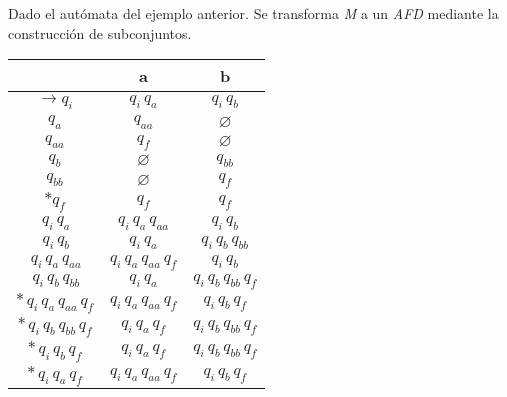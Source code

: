 Dado el autómata del ejemplo anterior. Se transforma \textit{M} a un \textit{AFD} mediante la construcción de subconjuntos.
\begin{table}[h]
  \centering
  \begin{tabular}{c|c|c}
    \hline
    & a & b \\
    \hline
    $\rightarrow q_i$ & $q_i\,q_a$ & $q_i\,q_b$ \\
    $q_a$             & $q_{aa}$   & $\varnothing$ \\
    $q_{aa}$          & $q_f$      & $\varnothing$ \\
    $q_b$             & $\varnothing$ & $q_{bb}$ \\
    $q_{bb}$          & $\varnothing$ & $q_f$ \\
    $*q_f$             & $q_f$      & $q_f$ \\
    \hline
    $\,q_i\,q_a$     & $q_i\,q_a\,q_{aa}$ & $q_i\,q_b$ \\
    $\,q_i\,q_b$     & $q_i\,q_a$         & $q_i\,q_b\,q_{bb}$ \\
    $\,q_i\,q_a\,q_{aa}$ & $q_i\,q_a\,q_{aa}\,q_f$ & $q_i\,q_b$ \\
    $\,q_i\,q_b\,q_{bb}$ & $q_i\,q_a$         & $q_i\,q_b\,q_{bb}\,q_f$ \\
    $*\,q_i\,q_a\,q_{aa}\,q_f$    & $q_i\,q_a\,q_{aa}\,q_f$      & $q_i\,q_b\,q_f$ \\
    $*\,q_i\,q_b\,q_{bb}\,q_f$ & $q_i\,q_a\,q_f$ & $q_i\,q_b\,q_{bb}\,q_f$ \\
    $*\,q_i\,q_b\,q_f$ & $q_i\,q_a\,q_f$         & $q_i\,q_b\,q_{bb}\,q_f$ \\
    $*\,q_i\,q_a\,q_f$ & $q_i\,q_a\,q_{aa}\,q_f$         & $q_i\,q_b\,q_f$ \\
    \hline
  \end{tabular}
\end{table}


